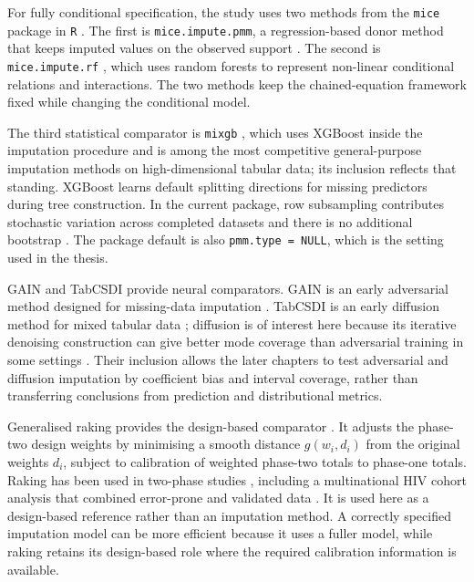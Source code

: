 For fully conditional specification, the study uses two methods from the \texttt{mice} package in \texttt{R} \citep{vanBuuren2011}. The first is \texttt{mice.impute.pmm}, a regression-based donor method that keeps imputed values on the observed support \citep{vanBuuren2018}. The second is \texttt{mice.impute.rf} \citep{doove2014recursive}, which uses random forests to represent non-linear conditional relations and interactions. The two methods keep the chained-equation framework fixed while changing the conditional model.

The third statistical comparator is \texttt{mixgb} \citep{deng2024multiple}, which uses XGBoost \citep{chen2016xgboost} inside the imputation procedure and is among the most competitive general-purpose imputation methods on high-dimensional tabular data; its inclusion reflects that standing. XGBoost learns default splitting directions for missing predictors during tree construction. In the current package, row subsampling contributes stochastic variation across completed datasets and there is no additional bootstrap \citep{deng2026mixgb}. The package default is also \texttt{pmm.type = NULL}, which is the setting used in the thesis.

GAIN and TabCSDI provide neural comparators. GAIN is an early adversarial method designed for missing-data imputation \citep{yoon2018gain}. TabCSDI is an early diffusion method for mixed tabular data \citep{zheng2022diffusion}; diffusion is of interest here because its iterative denoising construction can give better mode coverage than adversarial training in some settings \citep{song2020score}. Their inclusion allows the later chapters to test adversarial and diffusion imputation by coefficient bias and interval coverage, rather than transferring conclusions from prediction and distributional metrics.

Generalised raking provides the design-based comparator \citep{deville1992calibration, lumley2011connections}. It adjusts the phase-two design weights by minimising a smooth distance $g(w_i,d_i)$ from the original weights $d_i$, subject to calibration of weighted phase-two totals to phase-one totals. Raking has been used in two-phase studies \citep{lumley2011connections, breslow2009improved}, including a multinational HIV cohort analysis that combined error-prone and validated data \citep{slone2026analysis}. It is used here as a design-based reference rather than an imputation method. A correctly specified imputation model can be more efficient because it uses a fuller model, while raking retains its design-based role where the required calibration information is available.


